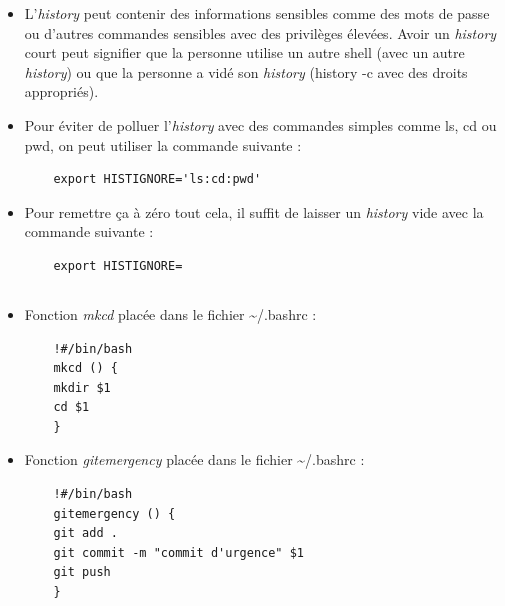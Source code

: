 \documentclass{article}
\begin{document}
\begin{itemize}
    \item L’\emph{history} peut contenir des informations sensibles comme des mots de passe ou d’autres commandes sensibles avec des privilèges élevées. Avoir un \emph{history} court peut signifier que la personne utilise un autre shell (avec un autre \emph{history}) ou que la personne a vidé son \emph{history} (history -c avec des droits appropriés).
    \item Pour éviter de polluer l’\emph{history} avec des commandes simples comme ls, cd ou pwd, on peut utiliser la commande suivante :
    \begin{lstlisting}
    export HISTIGNORE='ls:cd:pwd'
    \end{lstlisting}
    \item Pour remettre ça à zéro tout cela, il suffit de laisser un \emph{history} vide avec la commande suivante :
    \begin{lstlisting}
    export HISTIGNORE=
    \end{lstlisting}
\end{itemize}

\subsection{}

\begin{itemize}
    \item Fonction \emph{mkcd} placée dans le fichier \textasciitilde/.bashrc :
    \begin{lstlisting}
    !#/bin/bash
    mkcd () {
	mkdir $1
	cd $1
    }
    \end{lstlisting}
    \item Fonction \emph{gitemergency} placée dans le fichier \textasciitilde/.bashrc :
    \begin{lstlisting}
    !#/bin/bash
    gitemergency () {
	git add .
	git commit -m "commit d'urgence" $1
	git push
    }
    \end{lstlisting}
\end{itemize}

\subsection{}
\end{document}
